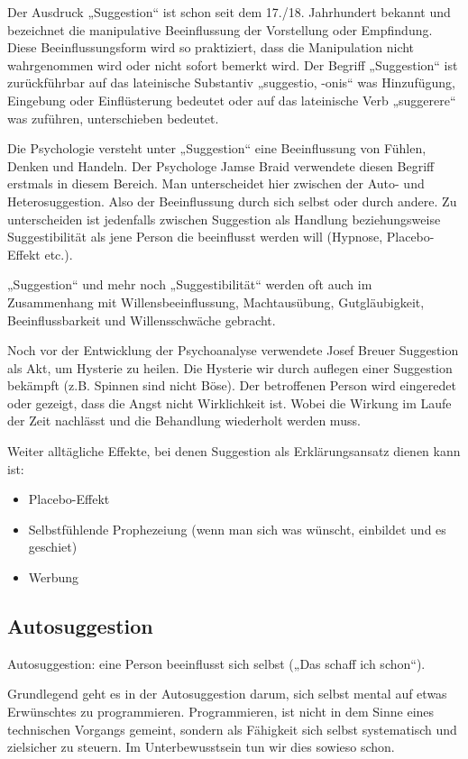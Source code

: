 Der Ausdruck „Suggestion“ ist schon seit dem 17./18. Jahrhundert bekannt und bezeichnet die
manipulative Beeinflussung der Vorstellung oder Empfindung. Diese Beeinflussungsform wird so
praktiziert, dass die Manipulation nicht wahrgenommen wird oder nicht sofort bemerkt wird. Der
Begriff „Suggestion“ ist zurückführbar auf das lateinische Substantiv „suggestio, -onis“ was
Hinzufügung, Eingebung oder Einflüsterung bedeutet oder auf das lateinische Verb „suggerere“ was
zuführen, unterschieben bedeutet.

Die Psychologie versteht unter „Suggestion“ eine Beeinflussung von Fühlen, Denken und Handeln. Der
Psychologe Jamse Braid verwendete diesen Begriff erstmals in diesem Bereich.
Man unterscheidet hier zwischen der Auto- und Heterosuggestion. Also der Beeinflussung durch sich
selbst oder durch andere.
Zu unterscheiden ist jedenfalls zwischen Suggestion als Handlung beziehungsweise Suggestibilität als
jene Person die beeinflusst werden will (Hypnose, Placebo-Effekt etc.).

„Suggestion“ und mehr noch „Suggestibilität“ werden oft auch im Zusammenhang mit
Willensbeeinflussung, Machtausübung, Gutgläubigkeit, Beeinflussbarkeit und Willensschwäche gebracht.

Noch vor der Entwicklung der Psychoanalyse verwendete Josef Breuer Suggestion als Akt, um Hysterie zu
heilen. Die Hysterie wir durch auflegen einer Suggestion bekämpft (z.B. Spinnen sind nicht Böse). Der
betroffenen Person wird eingeredet oder gezeigt, dass die Angst nicht Wirklichkeit ist. Wobei die
Wirkung im Laufe der Zeit nachlässt und die Behandlung wiederholt werden muss.

Weiter alltägliche Effekte, bei denen Suggestion als Erklärungsansatz dienen kann ist:
\begin{itemize}
	\item Placebo-Effekt
	\item Selbstfühlende Prophezeiung (wenn man sich was wünscht, einbildet und es geschiet)
	\item Werbung
\end{itemize}

\subsection{Autosuggestion}
Autosuggestion: eine Person beeinflusst sich selbst („Das schaff ich schon“).

Grundlegend geht es in der Autosuggestion darum, sich selbst mental auf etwas Erwünschtes zu
programmieren.
Programmieren, ist nicht in dem Sinne eines technischen Vorgangs gemeint, sondern als Fähigkeit sich
selbst systematisch und zielsicher zu steuern. Im Unterbewusstsein tun wir dies sowieso schon.

